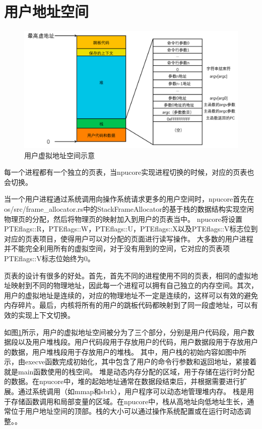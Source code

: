 \section{用户地址空间}
\begin{figure}[htb]
    \centering
    \includegraphics[width=\textwidth]{figures/04-04-用户地址空间示意图.png}
    \caption{
        用户虚拟地址空间示意
    }
    \label{fig:user virtual process}
\end{figure}
每一个进程都有一个独立的页表，当npucore实现进程切换的时候，对应的页表也会切换。

当一个用户进程通过系统调用向操作系统请求更多的用户空间时，npucore首先在os/src/frame_allocator.rs中的StackFrameAllocator的基于栈的数据结构实现空闲物理页的分配，然后将物理页的映射加入到用户的页表当中。
npucore将设置PTEflags::R，PTEflags::W，PTEflags::U，PTEflags::X以及PTEflags::V标志位到对应的页表项目，使得用户可以对分配的页面进行读写操作。
大多数的用户进程并不能完全利用所有的虚拟空间，对于没有用到的空间，它对应的页表项PTEflags::V标志位始终为0。

页表的设计有很多的好处。首先，首先不同的进程使用不同的页表，相同的虚拟地址映射到不同的物理地址，因此每一个进程可以拥有自己独立的内存空间。其次，用户的虚拟地址是连续的，对应的物理地址不一定是连续的，这样可以有效的避免内存碎片。最后，内核将所有的用户的跳板代码都映射到了同一段虚地址，可以有效的实现上下文切换。

如图\ref{fig:user virtual process}所示，用户的虚拟地址空间被分为了三个部分，分别是用户代码段，用户数据段以及用户堆栈段。用户代码段用于存放用户的代码，用户数据段用于存放用户的数据，用户堆栈段用于存放用户的堆栈。
其中，用户栈的初始内容如图中所示，由execve函数完成初始化，其中包含了用户的命令行参数和返回地址，紧接着就是main函数使用的栈空间。
堆是动态内存分配的区域，用于存储在运行时分配的数据。在npucore中，堆的起始地址通常在数据段结束后，并根据需要进行扩展。通过系统调用（如mmap和sbrk），用户程序可以动态地管理堆内存。
栈是用于存储函数调用和局部变量的区域。在npucore中，栈从高地址向低地址生长，通常位于用户地址空间的顶部。栈的大小可以通过操作系统配置或在运行时动态调整。。

